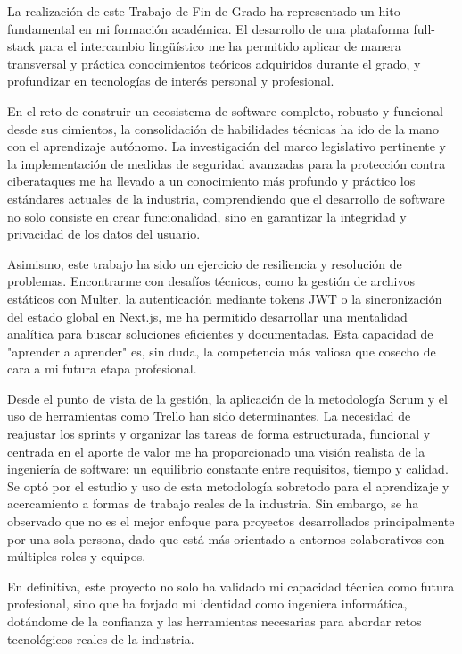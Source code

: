 La realización de este Trabajo de Fin de Grado ha representado un hito fundamental en mi formación académica. El desarrollo de una plataforma full-stack para el intercambio lingüístico me ha permitido aplicar de manera transversal y práctica conocimientos teóricos adquiridos durante el grado, y profundizar en tecnologías de interés personal y profesional.

En el reto de construir un ecosistema de software completo, robusto y funcional desde sus cimientos, la consolidación de habilidades técnicas ha ido de la mano con el aprendizaje autónomo. La investigación del marco legislativo pertinente y la implementación de medidas de seguridad avanzadas para la protección contra ciberataques me ha llevado a un conocimiento más profundo y práctico los estándares actuales de la industria, comprendiendo que el desarrollo de software no solo consiste en crear funcionalidad, sino en garantizar la integridad y privacidad de los datos del usuario.

Asimismo, este trabajo ha sido un ejercicio de resiliencia y resolución de problemas. Encontrarme con desafíos técnicos, como la gestión de archivos estáticos con Multer, la autenticación mediante tokens JWT o la sincronización del estado global en Next.js, me ha permitido desarrollar una mentalidad analítica para buscar soluciones eficientes y documentadas. Esta capacidad de "aprender a aprender" es, sin duda, la competencia más valiosa que cosecho de cara a mi futura etapa profesional.

Desde el punto de vista de la gestión, la aplicación de la metodología Scrum y el uso de herramientas como Trello han sido determinantes. La necesidad de reajustar los sprints y organizar las tareas de forma estructurada, funcional y centrada en el aporte de valor me ha proporcionado una visión realista de la ingeniería de software: un equilibrio constante entre requisitos, tiempo y calidad. Se optó por el estudio y uso de esta metodología sobretodo para el aprendizaje y acercamiento a formas de trabajo reales de la industria. Sin embargo, se ha observado que no es el mejor enfoque para proyectos desarrollados principalmente por una sola persona, dado que está más orientado a entornos colaborativos con múltiples roles y equipos.

En definitiva, este proyecto no solo ha validado mi capacidad técnica como futura profesional, sino que ha forjado mi identidad como ingeniera informática, dotándome de la confianza y las herramientas necesarias para abordar retos tecnológicos reales de la industria.